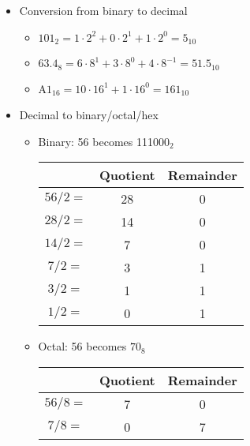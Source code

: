 \begin{itemize}
\begin{itemize}
    \end{itemize}

  \item Conversion from binary to decimal

    \begin{itemize}

      \item $101_2=1\cdot2^2 + 0\cdot2^1 + 1\cdot2^0 = 5_{10}$

      \item $63.4_8=6\cdot8^1 + 3\cdot8^0+4\cdot8^{-1}=51.5_{10}$

      \item A$1_{16}=10\cdot16^1 + 1\cdot16^0=161_{10}$

    \end{itemize}

  \item Decimal to binary/octal/hex

    \begin{itemize}

      \item Binary: 56 becomes 111000$_2$

        \begin{center}
        \begin{tabular}[h]{c|c|c}
          & Quotient & Remainder\\
          \hline
          $56 / 2 =$ & 28 & 0\\
          $28 / 2 =$ & 14 & 0\\
          $14 / 2 =$ & 7 & 0\\
          $7 / 2 =$ & 3 & 1\\
          $3 / 2 =$ & 1 & 1\\
          $1 / 2 =$ & 0 & 1\\
        \end{tabular}
        \end{center}

    \item Octal: 56 becomes $70_8$

        \begin{center}
        \begin{tabular}[h]{c|c|c}
          & Quotient & Remainder\\
          \hline
          $56 / 8 =$ & 7 & 0\\
          $7 / 8 =$ & 0 & 7\\
        \end{tabular}
        \end{center}


\end{itemize}
\end{itemize}
